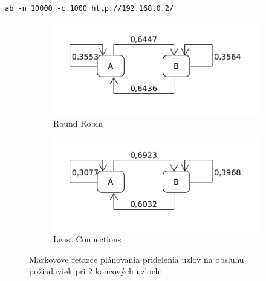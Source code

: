 \documentclass[12pt, a4paper]{article}
\begin{document}
\begin{lrbox}{\shield}
\verb|ab -n 10000 -c 1000 http://192.168.0.2/|
\end{lrbox}
\begin{figure}[h!]
	\centering
	\begin{subfigure}[t]{.48\textwidth}
  		\centering
  		\includegraphics[width=\textwidth]{images/10000-2-RR.png}
  		\caption{Round Robin}
	\end{subfigure}
	\begin{subfigure}[t]{.48\textwidth}
  		\centering
  		\includegraphics[width=\textwidth]{images/10000-2-LC.png}
  		\caption{Least Connections}
	\end{subfigure}
	\caption{Markovove reťazce plánovania pridelenia uzlov na obsluhu požiadaviek
	pri 2 koncových uzloch: \usebox{\shield}
	}
\end{figure}
\end{document}
